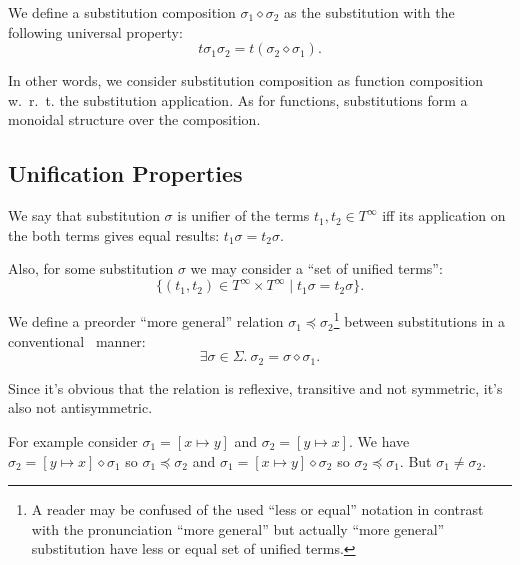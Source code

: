We define a substitution composition $\sigma_1 \diamond \sigma_2$ as the substitution with the following universal property:
\[t \sigma_1 \sigma_2 = t (\sigma_2 \diamond \sigma_1).\]

In other words, we consider substitution composition as function composition w.~r.~t. the substitution application. As for functions, substitutions form a monoidal structure over the composition.

% 


\subsection{Unification Properties}

We say that substitution $\sigma$ is unifier of the terms $t_1, t_2 \in T^\infty$ iff its application on the both terms gives equal results: $t_1 \sigma = t_2 \sigma$.

Also, for some substitution $\sigma$ we may consider a ``set of unified terms'':
\[\{ (t_1, t_2) \in T^\infty \times T^\infty \mid t_1 \sigma = t_2 \sigma \}.\]

We define a preorder ``more general'' relation $\sigma_1 \preceq \sigma_2$\footnote{A reader may be confused of the used ``less or equal'' notation in contrast with the pronunciation ``more general'' but actually ``more general'' substitution have less or equal set of unified terms.} between substitutions in a conventional~\cite{baader2001unification} manner:
\[\exists \sigma \in \Sigma. ~ \sigma_2 = \sigma \diamond \sigma_1.\]

Since it's obvious that the relation is reflexive, transitive and not symmetric, it's also not antisymmetric.

For example consider $\sigma_1 = [x \mapsto y]$ and $\sigma_2 = [y \mapsto x]$. We have $\sigma_2 = [y \mapsto x] \diamond \sigma_1$ so $\sigma_1 \preceq \sigma_2$ and $\sigma_1 = [x \mapsto y] \diamond \sigma_2$ so $\sigma_2 \preceq \sigma_1$. But $\sigma_1 \neq \sigma_2$.

